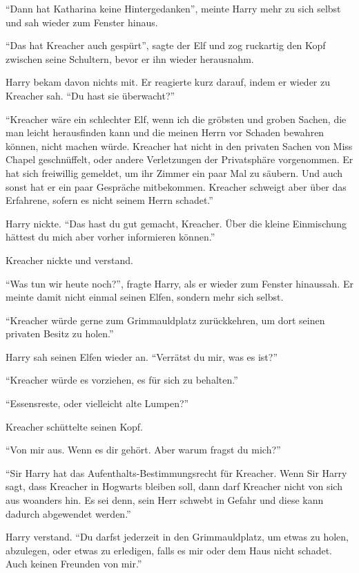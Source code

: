 \enquote{Dann hat Katharina keine Hintergedanken}, meinte Harry mehr zu sich selbst und sah wieder zum Fenster hinaus.

\enquote{Das hat Kreacher auch gespürt}, sagte der Elf und zog ruckartig den Kopf zwischen seine Schultern, bevor er ihn wieder herausnahm.

Harry bekam davon nichts mit. Er reagierte kurz darauf, indem er wieder zu Kreacher sah. \enquote{Du hast sie überwacht?}

\enquote{Kreacher wäre ein schlechter Elf, wenn ich die gröbsten und groben Sachen, die man leicht herausfinden kann und die meinen Herrn vor Schaden bewahren können, nicht machen würde. Kreacher hat nicht in den privaten Sachen von Miss Chapel geschnüffelt, oder andere Verletzungen der Privatsphäre vorgenommen. Er hat sich freiwillig gemeldet, um ihr Zimmer ein paar Mal zu säubern. Und auch sonst hat er ein paar Gespräche mitbekommen. Kreacher schweigt aber über das Erfahrene, sofern es nicht seinem Herrn schadet.}

Harry nickte. \enquote{Das hast du gut gemacht, Kreacher. Über die kleine Einmischung hättest du mich aber vorher informieren können.}

Kreacher nickte und verstand.

\enquote{Was tun wir heute noch?}, fragte Harry, als er wieder zum Fenster hinaussah. Er meinte damit nicht einmal seinen Elfen, sondern mehr sich selbst.

\enquote{Kreacher würde gerne zum Grimmauldplatz zurückkehren, um dort seinen privaten Besitz zu holen.}

Harry sah seinen Elfen wieder an. \enquote{Verrätst du mir, was es ist?}

\enquote{Kreacher würde es vorziehen, es für sich zu behalten.}

\enquote{Essensreste, oder vielleicht alte Lumpen?}

Kreacher schüttelte seinen Kopf.

\enquote{Von mir aus. Wenn es dir gehört. Aber warum fragst du mich?}

\enquote{Sir Harry hat das Aufenthalts-Bestimmungsrecht für Kreacher. Wenn Sir Harry sagt, dass Kreacher in Hogwarts bleiben soll, dann darf Kreacher nicht von sich aus woanders hin. Es sei denn, sein Herr schwebt in Gefahr und diese kann dadurch abgewendet werden.}

Harry verstand. \enquote{Du darfst jederzeit in den Grimmauldplatz, um etwas zu holen, abzulegen, oder etwas zu erledigen, falls es mir oder dem Haus nicht schadet. Auch keinen Freunden von mir.}

